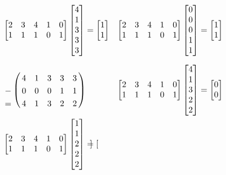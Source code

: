 \documentclass[a4paper,12pt]{article}
\theoremstyle{definition}%
\theoremstyle{definition}
\theoremstyle{problem}
\let\bbordermatrix\bordermatrix
\begin{document}
\begin{enumerate}[label=\alph*)]
\begin{align*}
&\begin{bmatrix}
2& 3& 4& 1& 0\\
1& 1& 1& 0& 1 
\end{bmatrix}\begin{bmatrix}
4\\ 1\\ 3\\ 3\\ 3
\end{bmatrix}=\begin{bmatrix}
1\\1
\end{bmatrix}& \begin{bmatrix}
2& 3& 4& 1& 0\\
1& 1& 1& 0& 1 
\end{bmatrix}\begin{bmatrix}
0\\ 0\\ 0\\ 1\\ 1
\end{bmatrix}=\begin{bmatrix}
1\\1
\end{bmatrix}\\
&\bbordermatrix{
&&&&&\cr
&4&1&3&3&3\cr
-&0&0&0&1&1\cr
=&4&1&3&2&2
}&\begin{bmatrix}
2& 3& 4& 1& 0\\
1& 1& 1& 0& 1 
\end{bmatrix}\begin{bmatrix}
4\\ 1\\ 3\\ 2\\ 2
\end{bmatrix}=\begin{bmatrix}
0\\0
\end{bmatrix}\\
&\begin{bmatrix}
2& 3& 4& 1& 0\\
1& 1& 1& 0& 1 
\end{bmatrix}\begin{bmatrix}
1\\ 1\\ 2\\ 2\\ 2
\end{bmatrix}=\begin{bmatrix}

\end{bmatrix}
\end{align*}
\end{enumerate}
\end{document}
